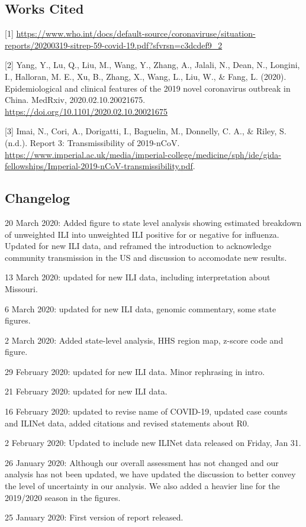 \documentclass[]{article}
\begin{document}
\hypertarget{works-cited}{%
\subsection{Works Cited}\label{works-cited}}

{[}1{]}
\url{https://www.who.int/docs/default-source/coronaviruse/situation-reports/20200319-sitrep-59-covid-19.pdf?sfvrsn=c3dcdef9_2}

{[}2{]} Yang, Y., Lu, Q., Liu, M., Wang, Y., Zhang, A., Jalali, N.,
Dean, N., Longini, I., Halloran, M. E., Xu, B., Zhang, X., Wang, L.,
Liu, W., \& Fang, L. (2020). Epidemiological and clinical features of
the 2019 novel coronavirus outbreak in China. MedRxiv,
2020.02.10.20021675. \url{https://doi.org/10.1101/2020.02.10.20021675}

{[}3{]} Imai, N., Cori, A., Dorigatti, I., Baguelin, M., Donnelly, C.
A., \& Riley, S. (n.d.). Report 3: Transmissibility of 2019-nCoV.
\url{https://www.imperial.ac.uk/media/imperial-college/medicine/sph/ide/gida-fellowships/Imperial-2019-nCoV-transmissibility.pdf}.

\clearpage

\hypertarget{changelog}{%
\subsection{Changelog}\label{changelog}}

20 March 2020: Added figure to state level analysis showing estimated
breakdown of unweighted ILI into unweighted ILI positive for or negative
for influenza. Updated for new ILI data, and reframed the introduction
to acknowledge community transmission in the US and discussion to
accomodate new results.

13 March 2020: updated for new ILI data, including interpretation about
Missouri.

6 March 2020: updated for new ILI data, genomic commentary, some state
figures.

2 March 2020: Added state-level analysis, HHS region map, z-score code
and figure.

29 February 2020: updated for new ILI data. Minor rephrasing in intro.

21 February 2020: updated for new ILI data.

16 February 2020: updated to revise name of COVID-19, updated case
counts and ILINet data, added citations and revised statements about R0.

2 February 2020: Updated to include new ILINet data released on Friday,
Jan 31.

26 January 2020: Although our overall assessment has not changed and our
analysis has not been updated, we have updated the discussion to better
convey the level of uncertainty in our analysis. We also added a heavier
line for the 2019/2020 season in the figures.

25 January 2020: First version of report released.
\end{document}

